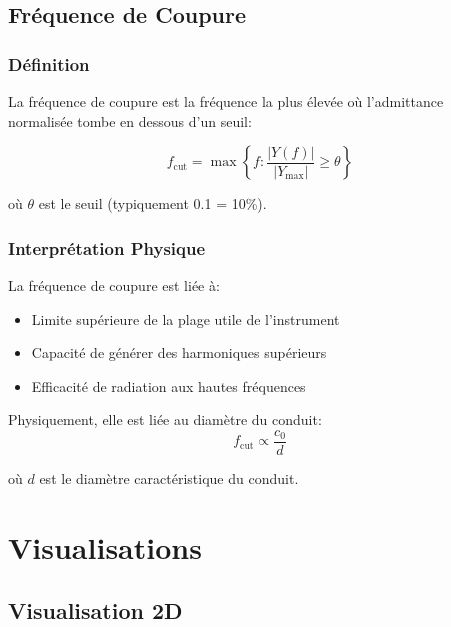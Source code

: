 \documentclass[12pt,a4paper,twocolumn]{article}
\newcommand{\admittance}{Y}
\newcommand{\freq}{f}
\begin{document}
\subsection{Fréquence de Coupure}

\subsubsection{Définition}

La fréquence de coupure est la fréquence la plus élevée où l'admittance normalisée tombe en dessous d'un seuil:

\begin{equation}
\freq_{\text{cut}} = \max\left\{f : \frac{|\admittance(f)|}{|\admittance_{\max}|} \geq \theta\right\}
\label{eq:cutoff_freq}
\end{equation}

où $\theta$ est le seuil (typiquement 0.1 = 10\%).

\subsubsection{Interprétation Physique}

La fréquence de coupure est liée à:

\begin{itemize}
    \item Limite supérieure de la plage utile de l'instrument
    \item Capacité de générer des harmoniques supérieurs
    \item Efficacité de radiation aux hautes fréquences
\end{itemize}

Physiquement, elle est liée au diamètre du conduit:
\begin{equation}
\freq_{\text{cut}} \propto \frac{c_0}{d}
\label{eq:cutoff_diametre}
\end{equation}

où $d$ est le diamètre caractéristique du conduit.

\section{Visualisations}

\subsection{Visualisation 2D}
\end{document}
